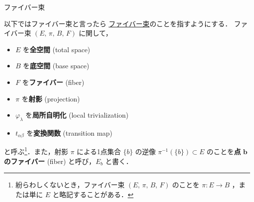 \documentclass[geometry_main]{subfiles}
\begin{document}
\begin{mydef}[label=def.fiber-1,breakable]{\cinfty ファイバー束}
\end{mydef}

以下ではファイバー束と言ったら \hyperref[def.fiber-1]{\cinfty ファイバー束}のことを指すようにする．
ファイバー束 $(E,\, \pi ,\, B,\, F)$ に関して，
\begin{itemize}
	\item $E$ を\textbf{全空間} (total space)
	\item $B$ を\textbf{底空間} (base space)
	\item $F$ を\textbf{ファイバー} (fiber)
	\item $\pi$ を\textbf{射影} (projection)
	\item $\varphi_\lambda$ を\textbf{局所自明化} (local trivialization)
	\item $t_{\alpha\beta}$ を\textbf{変換関数} (transition map)
\end{itemize}
と呼ぶ\footnote{紛らわしくないとき，ファイバー束 $(E,\, \pi,\, B,\, F)$ のことを $\pi \colon E \to B$ ，または単に $E$ と略記することがある．}．また，射影 $\pi$ による1点集合 $\{b\}$ の逆像 $\pi^{-1}(\{b\}) \subset E$ のことを\textbf{点} $\bm{b}$ \textbf{のファイバー} (fiber) と呼び，$E_b$ と書く．\label{def:point-fiber}
\end{document}
